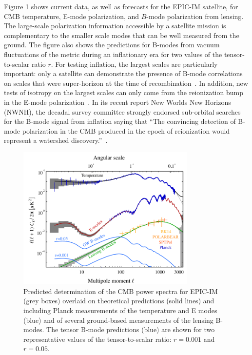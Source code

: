Figure \ref{fig:clall} shows current data, as well as forecasts for the EPIC-IM satellite, for CMB temperature, E-mode polarization, and $B$-mode polarization from lensing. The large-scale polarization information 
accessible by a satellite mission is complementary to the smaller scale modes that can be well measured from the ground. The figure also shows the predictions for B-modes from vacuum fluctuations of the metric during an inflationary era for two values of the tensor-to-scalar ratio $r$. For testing inflation, the largest scales are particularly important: only a satellite can demonstrate the presence of B-mode correlations on 
scales that were super-horizon at the time of recombination~\cite{Lee:2014cya}. In addition, new tests of isotropy on the 
largest scales can only come from the reionization bump in the E-mode polarization~\cite{}. In its recent report New Worlds New Horizons (NWNH), the decadal survey committee 
strongly endorsed sub-orbital searches for the B-mode signal from inflation saying that ``The convincing detection of 
B-mode polarization in the CMB produced in the epoch of reionization would represent a watershed discovery.''~\cite{blandford2010}. 
\begin{figure}[ht!]
\hspace{-0.2in}
\parbox{4.in}{\centerline {
\includegraphics[width=3.5in]{figs/cmb_powspec_v1.pdf} } }
\hspace{0.1in}
\parbox{2.5in}{
\caption{ \small \setlength{\baselineskip}{0.95\baselineskip}
Predicted determination of the \ac{CMB} power spectra for EPIC-IM (grey boxes) overlaid
on theoretical predictions (solid lines) and including Planck measurements of the 
temperature and E modes (blue) and of several ground-based measurements 
of the lensing B-modes.  The tensor B-mode predictions (blue) are shown 
for two representative values of the tensor-to-scalar
ratio: $r=0.001$ and $r=0.05.$ 
\label{fig:clall} } }
\vspace{-0.1in}
\end{figure}


